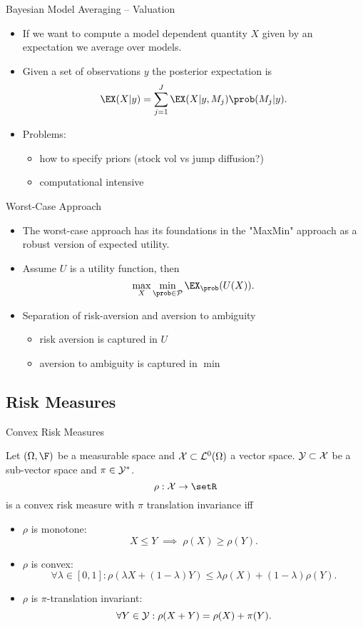 {Bayesian Model Averaging -- Valuation}
\begin{itemize}
\item<1-> If we want to compute a model dependent quantity $X$ given by an expectation we average over models.
\item<2-> Given a set of observations $y$ the posterior expectation is
$$
\EX(X|y) = \sum_{j=1}^{J} \EX(X |y, M_j) \prob(M_j |y).
$$
\item<3-> Problems:
\begin{itemize}
\item how to specify priors (stock vol vs jump diffusion?)
\item computational intensive
\end{itemize}

\end{itemize}




{Worst-Case Approach}
\begin{itemize}
\item<1-> The worst-case approach has its foundations in the "MaxMin" approach as a robust version of expected utility. \item<2-> Assume $U$ is a utility function, then
$$
\max _X \min_{\prob \in {\cal P}} \EX_{\prob}(U(X)).
$$
\item<3-> Separation of risk-aversion and aversion to ambiguity
\begin{itemize}
\item risk aversion is captured in $U$
\item aversion to ambiguity is captured in $\min$
\end{itemize}

\end{itemize}



\subsection{Risk Measures}

{Convex Risk Measures}

Let $(\Omega, \F)$ be a measurable space and ${\cal X} \subset {\cal L}^0(\Omega)$ a vector space. ${\cal Y} \subset {\cal X}$ be a sub-vector space and
$\pi \in {\cal Y}^*$.
\begin{equation}
\rho: {\cal X} \rightarrow \setR
\end{equation}
is a convex risk measure with $\pi$ translation invariance iff
\begin{itemize}
\item $\rho$ is monotone: $$X \leq Y \;  \implies \; \rho(X) \geq \rho(Y).$$
\item $\rho$ is convex: $$\forall \lambda \in [0,1]: \rho(\lambda X + (1-\lambda) Y) \leq \lambda \rho(X) + (1-\lambda) \rho(Y).$$
\item $\rho$ is $\pi$-translation invariant: $$\forall Y \in {\cal Y}: \rho(X+Y) = \rho(X) + \pi(Y).$$
\end{itemize}




